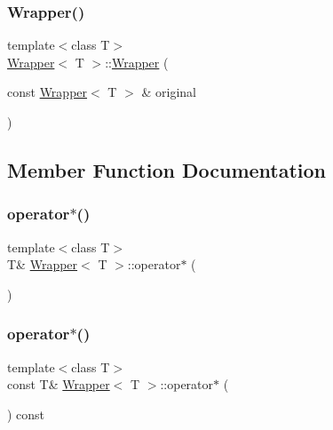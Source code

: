\hypertarget{classWrapper_a61fbc2f8719cbbb237bab3c94aef6a53}{}\label{classWrapper_a61fbc2f8719cbbb237bab3c94aef6a53} 
\subsubsection{\texorpdfstring{Wrapper()}{Wrapper()}\hspace{0.1cm}{\footnotesize\ttfamily [4/4]}}
{\footnotesize\ttfamily template$<$class T$>$ \\
\hyperlink{classWrapper}{Wrapper}$<$ T $>$\+::\hyperlink{classWrapper}{Wrapper} (\begin{DoxyParamCaption}\item[{const \hyperlink{classWrapper}{Wrapper}$<$ T $>$ \&}]{original }\end{DoxyParamCaption})\hspace{0.3cm}{\ttfamily [inline]}}



\subsection{Member Function Documentation}
\hypertarget{classWrapper_a7ba49562f1fb7f35a27ea8197ac1713a}{}\label{classWrapper_a7ba49562f1fb7f35a27ea8197ac1713a} 
\subsubsection{\texorpdfstring{operator$\ast$()}{operator*()}\hspace{0.1cm}{\footnotesize\ttfamily [1/2]}}
{\footnotesize\ttfamily template$<$class T$>$ \\
T\& \hyperlink{classWrapper}{Wrapper}$<$ T $>$\+::operator$\ast$ (\begin{DoxyParamCaption}{ }\end{DoxyParamCaption})\hspace{0.3cm}{\ttfamily [inline]}}

\hypertarget{classWrapper_a1bc06a933dbc64dbe968342d793bad26}{}\label{classWrapper_a1bc06a933dbc64dbe968342d793bad26} 
\subsubsection{\texorpdfstring{operator$\ast$()}{operator*()}\hspace{0.1cm}{\footnotesize\ttfamily [2/2]}}
{\footnotesize\ttfamily template$<$class T$>$ \\
const T\& \hyperlink{classWrapper}{Wrapper}$<$ T $>$\+::operator$\ast$ (\begin{DoxyParamCaption}{ }\end{DoxyParamCaption}) const\hspace{0.3cm}{\ttfamily [inline]}}

